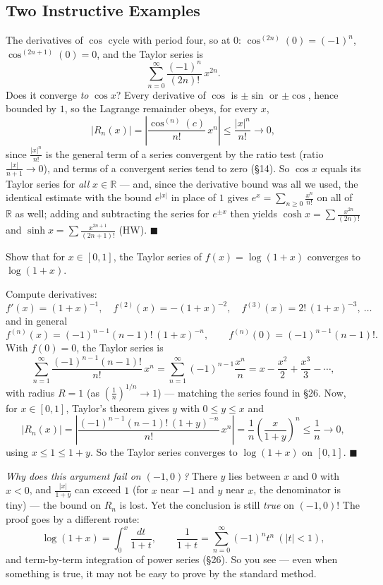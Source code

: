 \documentclass[11pt]{report}
\begin{document}
\subsection{Two Instructive Examples}

\begin{exbox}
The derivatives of $\cos$ cycle with period four, so at $0$: $\cos^{(2n)}(0) = (-1)^n$, $\cos^{(2n+1)}(0) = 0$, and the Taylor series is
\[
\sum_{n=0}^\infty \frac{(-1)^n}{(2n)!}\, x^{2n}.
\]
Does it converge \emph{to} $\cos x$? Every derivative of $\cos$ is $\pm\sin$ or $\pm\cos$, hence bounded by $1$, so the Lagrange remainder obeys, for every $x$,
\[
|R_n(x)| = \left| \frac{\cos^{(n)}(c)}{n!}\, x^n \right| \leq \frac{|x|^n}{n!} \longrightarrow 0,
\]
since $\tfrac{|x|^n}{n!}$ is the general term of a series convergent by the ratio test (ratio $\tfrac{|x|}{n+1} \to 0$), and terms of a convergent series tend to zero (\S 14). So $\cos x$ equals its Taylor series for \emph{all} $x \in \mathbb{R}$ --- and, since the derivative bound was all we used, the identical estimate with the bound $e^{|x|}$ in place of $1$ gives $e^x = \sum_{n\geq0} \tfrac{x^n}{n!}$ on all of $\mathbb{R}$ as well; adding and subtracting the series for $e^{\pm x}$ then yields $\cosh x = \sum \tfrac{x^{2n}}{(2n)!}$ and $\sinh x = \sum \tfrac{x^{2n+1}}{(2n+1)!}$ (HW). \hfill $\blacksquare$
\end{exbox}

\begin{exbox}
Show that for $x \in [0,1]$, the Taylor series of $f(x) = \log(1+x)$ converges to $\log(1+x)$.

Compute derivatives:
\[
f'(x) = (1+x)^{-1},\quad f^{(2)}(x) = -(1+x)^{-2},\quad f^{(3)}(x) = 2!\,(1+x)^{-3},\ \ldots
\]
and in general
\[
f^{(n)}(x) = (-1)^{n-1}(n-1)!\,(1+x)^{-n}, \qquad f^{(n)}(0) = (-1)^{n-1}(n-1)!.
\]
With $f(0) = 0$, the Taylor series is
\[
\sum_{n=1}^\infty \frac{(-1)^{n-1}(n-1)!}{n!}\, x^n = \sum_{n=1}^\infty (-1)^{n-1} \frac{x^n}{n} = x - \frac{x^2}{2} + \frac{x^3}{3} - \cdots,
\]
with radius $R = 1$ (as $\left(\tfrac1n\right)^{1/n} \to 1$) --- matching the series found in \S 26. Now, for $x \in [0,1]$, Taylor's theorem gives $y$ with $0 \leq y \leq x$ and
\[
|R_n(x)| = \left| \frac{(-1)^{n-1}(n-1)!\,(1+y)^{-n}}{n!}\, x^n \right| = \frac1n \left( \frac{x}{1+y} \right)^n \leq \frac1n \longrightarrow 0,
\]
using $x \leq 1 \leq 1 + y$. So the Taylor series converges to $\log(1+x)$ on $[0,1]$. \hfill $\blacksquare$

\emph{Why does this argument fail on $(-1, 0)$?} There $y$ lies between $x$ and $0$ with $x < 0$, and $\tfrac{|x|}{1+y}$ can exceed $1$ (for $x$ near $-1$ and $y$ near $x$, the denominator is tiny) --- the bound on $R_n$ is lost. Yet the conclusion is still \emph{true} on $(-1,0)$! The proof goes by a different route:
\[
\log(1+x) = \int_0^x \frac{dt}{1+t}, \qquad \frac{1}{1+t} = \sum_{n=0}^\infty (-1)^n t^n \ (|t| < 1),
\]
and term-by-term integration of power series (\S 26). So you see --- even when something is true, it may not be easy to prove by the standard method.
\end{exbox}
\end{document}
